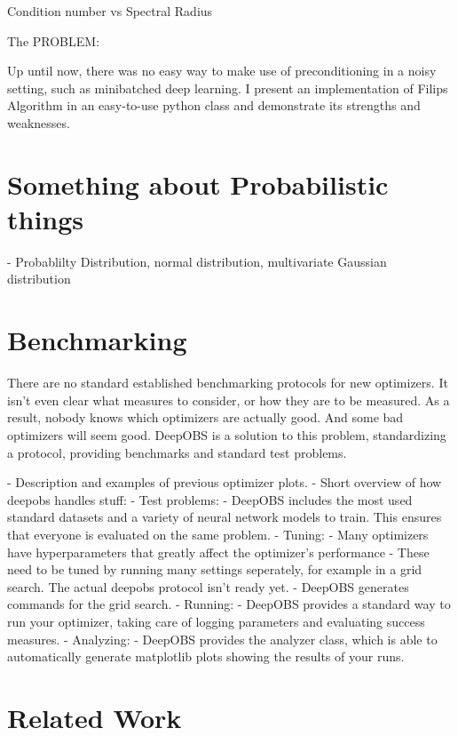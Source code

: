 \documentclass[twoside,12pt,a4paper]{report}
\begin{document}
Condition number vs Spectral Radius

The PROBLEM:

Up until now, there was no easy way to make use of preconditioning in a noisy setting, such as minibatched deep learning. I present an implementation of Filips Algorithm in an easy-to-use python class and demonstrate its strengths and weaknesses.

\section{Something about Probabilistic things}
- Probablilty Distribution, normal distribution, multivariate Gaussian distribution

\section{Benchmarking}
\begin{markdown}
There are no standard established benchmarking protocols for new optimizers. It isn't even clear what measures to consider, or how they are to be measured. As a result, nobody knows which optimizers are actually good. And some bad optimizers will seem good.
DeepOBS is a solution to this problem, standardizing a protocol, providing benchmarks and standard test problems.

- Description and examples of previous optimizer plots.
- Short overview of how deepobs handles stuff:
    - Test problems:
      	- DeepOBS includes the most used standard datasets and a variety of neural network models to train. This ensures that everyone is evaluated on the same problem.
    - Tuning:
    	- Many optimizers have hyperparameters that greatly affect the optimizer's performance
 	    - These need to be tuned by running many settings seperately, for example in a grid search. The actual deepobs protocol isn't ready yet.
      - DeepOBS generates commands for the grid search.
    - Running:
      	- DeepOBS provides a standard way to run your optimizer, taking care of logging parameters and evaluating success measures.
    - Analyzing:
      	- DeepOBS provides the analyzer class, which is able to automatically generate matplotlib plots showing the results of your runs.
\end{markdown}

\section{Related Work}
\end{document}
